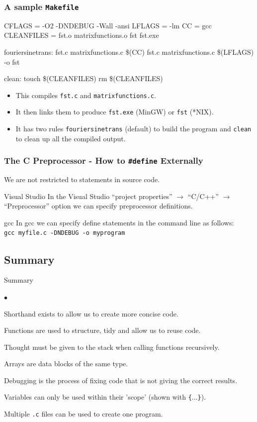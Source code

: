 \documentclass[smaller,table]{beamer}
\begin{document}
\begin{frame}[fragile]
\frametitle{A sample \tt{Makefile}}
\begin{exampleblock}{}
\begin{semiverbatim}
\scriptsize
CFLAGS = -O2 -DNDEBUG -Wall -ansi
LFLAGS = -lm
CC = gcc
CLEANFILES = fst.o matrixfunctions.o fst fst.exe

fouriersinetrans: fst.c matrixfunctions.c
         \$(CC) fst.c matrixfunctions.c \$(LFLAGS) -o fst
         
clean:
        touch \$(CLEANFILES)
        rm \$(CLEANFILES)
\end{semiverbatim}
\end{exampleblock}
\begin{itemize}
\item This compiles {\tt fst.c} and {\tt matrixfunctions.c}.
\item It then links them to produce {\tt fst.exe} (MinGW) or {\tt fst} (*NIX).
\item It has two rules {\tt fouriersinetrans} (default) to build the program and {\tt clean} to clean up all the compiled output.
\end{itemize}
\end{frame}

\begin{frame}
\frametitle{The C Preprocessor - How to {\tt\#define} Externally}
We are not restricted to {\tt {}} statements in source code.
\begin{block}{Visual Studio}
In the Visual Studio ``project properties'' $\rightarrow$ ``C/C++'' $\rightarrow$ ``Preprocessor'' option we can specify preprocessor definitions.
\end{block}

\begin{block}{gcc}
In gcc we can specify define statements in the command line as follows:\\
{\tt gcc myfile.c -DNDEBUG -o myprogram }
\end{block}
\end{frame}

\subsection{Summary}
\begin{frame}{Summary}
\begin{list}{$\bullet$}{}
\item Shorthand exists to allow us to create more concise code.
\item Functions are used to structure, tidy and allow us to reuse code.
\item Thought must be given to the stack when calling functions recursively.
\item Arrays are data blocks of the same type.
\item Debugging is the process of fixing code that is not giving the correct results.
\item Variables can only be used within their 'scope' (shown with \texttt{\{$\ldots$\}}).
\item Multiple \texttt{.c} files can be used to create one program.
\end{list}
\end{frame}
\end{document}

